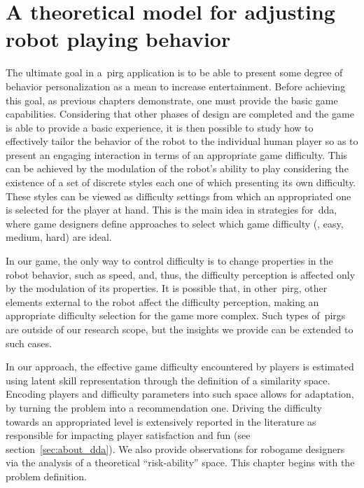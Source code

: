 \chapter{A theoretical model for adjusting robot playing behavior}\label{ch:adaptation}

The ultimate goal in a~\gls{pirg} application is to be able to present some degree of behavior personalization as a mean to increase entertainment. Before achieving this goal, as previous chapters demonstrate, one must provide the basic game capabilities. Considering that other phases of design are completed and the game is able to provide a basic experience, it is then possible to study how to effectively tailor the behavior of the robot to the individual human player so as to present an engaging interaction in terms of an appropriate game difficulty. This can be achieved by the modulation of the robot's ability to play considering the existence of a set of discrete styles each one of which presenting its own difficulty. These styles can be viewed as difficulty settings from which an appropriated one is selected for the player at hand. This is the main idea in strategies for~\glsdesc{dda}, where game designers define approaches to select which game difficulty (\eg, easy, medium, hard) are ideal. 

In our game, the only way to control difficulty is to change properties in the robot behavior, such as speed, and, thus, the difficulty perception is affected only by the modulation of its properties. It is possible that, in other~\gls{pirg}, other elements external to the robot affect the difficulty perception, making an appropriate difficulty selection for the game more complex. Such types of~\gls{pirg}s are outside of our research scope, but the insights we provide can be extended to such cases. 

In our approach, the effective game difficulty encountered by players is estimated using latent skill representation through the definition of a similarity space. Encoding players and difficulty parameters into such space allows for adaptation, by turning the problem into a recommendation one. Driving the difficulty towards an appropriated level is extensively reported in the literature as responsible for impacting player satisfaction and fun (see section~\ref{sec:about_dda}). %
We also provide observations for robogame designers via the analysis of a theoretical ``risk-ability'' space. This chapter begins with the problem definition.

